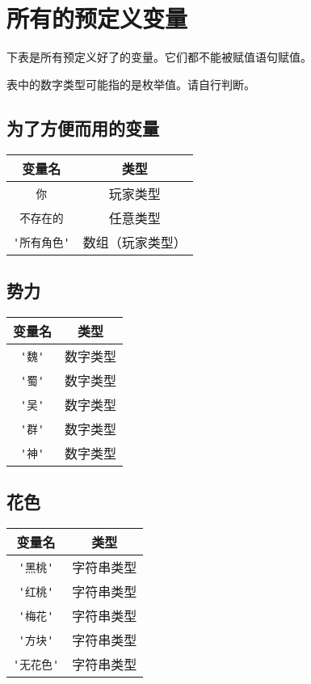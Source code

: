 \chapter{所有的预定义变量}

下表是所有预定义好了的变量。它们都不能被赋值语句赋值。

表中的数字类型可能指的是枚举值。请自行判断。

\section{为了方便而用的变量}
\begin{center}
\begin{longtable}{|c|c|}
\hline \textbf{变量名} & \textbf{类型} \\
\hline \verb|你| & 玩家类型 \\
\hline \verb|不存在的| & 任意类型 \\
\hline \verb|'所有角色'| & 数组（玩家类型） \\
\hline
\end{longtable}
\end{center}

\section{势力}

\begin{center}
\begin{longtable}{|c|c|}
\hline \textbf{变量名} & \textbf{类型} \\
\hline \verb|'魏'| & 数字类型 \\
\hline \verb|'蜀'| & 数字类型 \\
\hline \verb|'吴'| & 数字类型 \\
\hline \verb|'群'| & 数字类型 \\
\hline \verb|'神'| & 数字类型 \\
\hline
\end{longtable}
\end{center}

\section{花色}

\begin{center}
\begin{longtable}{|c|c|}
\hline \textbf{变量名} & \textbf{类型} \\
\hline \verb|'黑桃'| & 字符串类型 \\
\hline \verb|'红桃'| & 字符串类型 \\
\hline \verb|'梅花'| & 字符串类型 \\
\hline \verb|'方块'| & 字符串类型 \\
\hline \verb|'无花色'| & 字符串类型 \\
\hline
\end{longtable}
\end{center}

